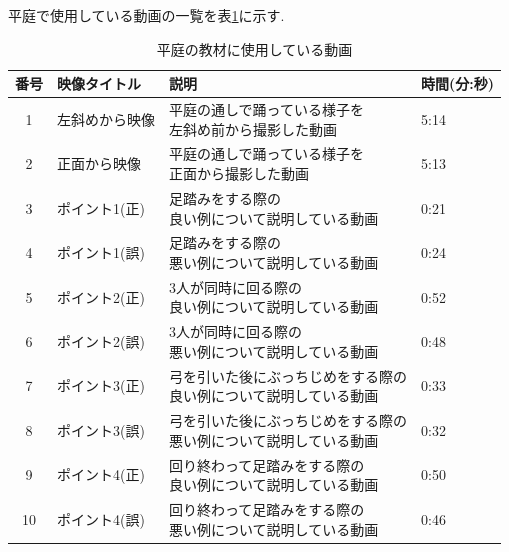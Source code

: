\documentclass[12pt]{ltjsarticle}
\begin{document}
 \clearpage

 平庭で使用している動画の一覧を表\ref{table:hhiraniwa}に示す.
 
 \begin{table}[h]
   \caption{平庭の教材に使用している動画}
   \label{table:hhiraniwa}
   \centering
   {\renewcommand\arraystretch{2.0}
    \begin{tabular}{clll}
     \hline
     番号 & 映像タイトル & 説明 & 時間(分:秒) \\
   
     \hline \hline
     1 &  左斜めから映像 &  \shortstack{平庭の通しで踊っている様子を\\左斜め前から撮影した動画} & 5:14 \\
     2 &  正面から映像 &  \shortstack{平庭の通しで踊っている様子を\\正面から撮影した動画} & 5:13 \\
     3 &  ポイント1(正) &  \shortstack{足踏みをする際の\\良い例について説明している動画} & 0:21 \\
     4 &  ポイント1(誤) &  \shortstack{足踏みをする際の\\悪い例について説明している動画} & 0:24 \\ 
     5 &  ポイント2(正) &  \shortstack{3人が同時に回る際の\\良い例について説明している動画} & 0:52 \\ 
     6 &  ポイント2(誤) &  \shortstack{3人が同時に回る際の\\悪い例について説明している動画} & 0:48 \\ 
     7 &  ポイント3(正) &  \shortstack{弓を引いた後にぶっちじめをする際の\\良い例について説明している動画} & 0:33 \\ 
     8 &  ポイント3(誤) &  \shortstack{弓を引いた後にぶっちじめをする際の\\悪い例について説明している動画} & 0:32 \\ 
     9 &  ポイント4(正) &  \shortstack{回り終わって足踏みをする際の\\良い例について説明している動画} & 0:50 \\ 
     10 &  ポイント4(誤) &  \shortstack{回り終わって足踏みをする際の\\悪い例について説明している動画} & 0:46 \\ 
   
 
 
 
 
   
 
     \hline
    \end{tabular}
   }
  \end{table}
 
\end{document}
